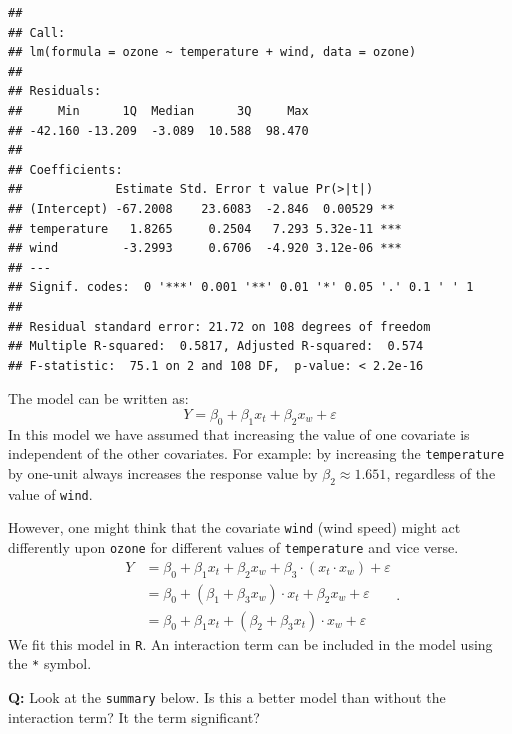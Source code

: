\documentclass[
  ignorenonframetext,
]{beamer}
\begin{document}
\begin{frame}[fragile]
\small

\begin{verbatim}
## 
## Call:
## lm(formula = ozone ~ temperature + wind, data = ozone)
## 
## Residuals:
##     Min      1Q  Median      3Q     Max 
## -42.160 -13.209  -3.089  10.588  98.470 
## 
## Coefficients:
##             Estimate Std. Error t value Pr(>|t|)    
## (Intercept) -67.2008    23.6083  -2.846  0.00529 ** 
## temperature   1.8265     0.2504   7.293 5.32e-11 ***
## wind         -3.2993     0.6706  -4.920 3.12e-06 ***
## ---
## Signif. codes:  0 '***' 0.001 '**' 0.01 '*' 0.05 '.' 0.1 ' ' 1
## 
## Residual standard error: 21.72 on 108 degrees of freedom
## Multiple R-squared:  0.5817, Adjusted R-squared:  0.574 
## F-statistic:  75.1 on 2 and 108 DF,  p-value: < 2.2e-16
\end{verbatim}

\normalsize
\end{frame}

\begin{frame}[fragile]
The model can be written as:
\[Y = \beta_0 + \beta_1 x_t + \beta_2 x_w + \varepsilon\] In this model
we have assumed that increasing the value of one covariate is
independent of the other covariates. For example: by increasing the
\texttt{temperature} by one-unit always increases the response value by
\(\beta_2 \approx 1.651\), regardless of the value of \texttt{wind}.
\end{frame}

\begin{frame}[fragile]
However, one might think that the covariate \texttt{wind} (wind speed)
might act differently upon \texttt{ozone} for different values of
\texttt{temperature} and vice verse. \[
\begin{aligned} Y &= \beta_0 +  \beta_1 x_t + \beta_2 x_w + \beta_3\cdot(x_t  \cdot x_w) +\varepsilon \\ 
&= \beta_0 +  (\beta_1 + \beta_3 x_w) \cdot x_t + \beta_2 x_w + \varepsilon \\ 
&= \beta_0 + \beta_1 x_t + (\beta_2 + \beta_3 x_t) \cdot x_w + \varepsilon \end{aligned}.
\] We fit this model in \texttt{R}. An interaction term can be included
in the model using the \texttt{*} symbol.

\textbf{Q:} Look at the \texttt{summary} below. Is this a better model
than without the interaction term? It the term significant?
\end{frame}
\end{document}
